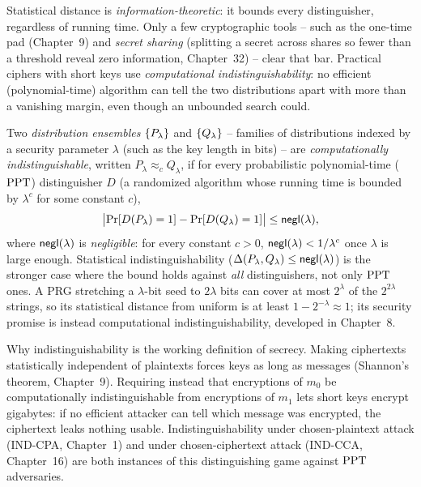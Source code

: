 Statistical distance is \emph{information-theoretic}: it bounds every distinguisher, regardless of running time. Only a few cryptographic tools -- such as the one-time pad (Chapter~9) and \emph{secret sharing} (splitting a secret across shares so fewer than a threshold reveal zero information, Chapter~32) -- clear that bar. Practical ciphers with short keys use \emph{computational indistinguishability}: no efficient (polynomial-time) algorithm can tell the two distributions apart with more than a vanishing margin, even though an unbounded search could.

\begin{formalbox}
Two \emph{distribution ensembles} $\{P_\lambda\}$ and $\{Q_\lambda\}$ -- families of distributions indexed by a security parameter $\lambda$ (such as the key length in bits) -- are \emph{computationally indistinguishable}, written $P_\lambda \approx_c Q_\lambda$, if for every probabilistic polynomial-time ($\mathrm{PPT}$) distinguisher $D$ (a randomized algorithm whose running time is bounded by $\lambda^c$ for some constant $c$),
\[
  \bigl\lvert \Pr[D(P_\lambda) = 1] - \Pr[D(Q_\lambda) = 1] \bigr\rvert \le \mathsf{negl}(\lambda),
\]
where $\mathsf{negl}(\lambda)$ is \emph{negligible}: for every constant $c > 0$, $\mathsf{negl}(\lambda) < 1/\lambda^c$ once $\lambda$ is large enough. Statistical indistinguishability ($\Delta(P_\lambda, Q_\lambda) \le \mathsf{negl}(\lambda)$) is the stronger case where the bound holds against \emph{all} distinguishers, not only $\mathrm{PPT}$ ones. A PRG stretching a $\lambda$-bit seed to $2\lambda$ bits can cover at most $2^\lambda$ of the $2^{2\lambda}$ strings, so its statistical distance from uniform is at least $1 - 2^{-\lambda} \approx 1$; its security promise is instead computational indistinguishability, developed in Chapter~8.
\end{formalbox}

\begin{whybox}
Why indistinguishability is the working definition of secrecy. Making ciphertexts statistically independent of plaintexts forces keys as long as messages (Shannon's theorem, Chapter~9). Requiring instead that encryptions of $m_0$ be computationally indistinguishable from encryptions of $m_1$ lets short keys encrypt gigabytes: if no efficient attacker can tell which message was encrypted, the ciphertext leaks nothing usable. Indistinguishability under chosen-plaintext attack (IND-CPA, Chapter~1) and under chosen-ciphertext attack (IND-CCA, Chapter~16) are both instances of this distinguishing game against $\mathrm{PPT}$ adversaries.
\end{whybox}

